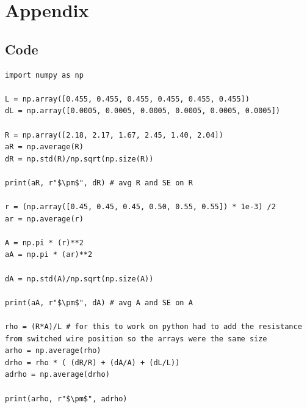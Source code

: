 \documentclass[12pt]{article}
\begin{document}
\newpage



 \label{sec:ref}

\vspace{1.5cm}

\listoffigures

\listoftables

\section*{Appendix} \label{sec:A}

\subsection*{Code}

%

\begin{minipage}{\linewidth}
\captionsetup{hypcap=false}

\begin{mintedbox}
\begin{verbatim}
import numpy as np

L = np.array([0.455, 0.455, 0.455, 0.455, 0.455, 0.455])
dL = np.array([0.0005, 0.0005, 0.0005, 0.0005, 0.0005, 0.0005])

R = np.array([2.18, 2.17, 1.67, 2.45, 1.40, 2.04])
aR = np.average(R)
dR = np.std(R)/np.sqrt(np.size(R))

print(aR, r"$\pm$", dR) # avg R and SE on R

r = (np.array([0.45, 0.45, 0.45, 0.50, 0.55, 0.55]) * 1e-3) /2
ar = np.average(r)

A = np.pi * (r)**2
aA = np.pi * (ar)**2

dA = np.std(A)/np.sqrt(np.size(A))

print(aA, r"$\pm$", dA) # avg A and SE on A

rho = (R*A)/L # for this to work on python had to add the resistance from switched wire position so the arrays were the same size
arho = np.average(rho)
drho = rho * ( (dR/R) + (dA/A) + (dL/L))
adrho = np.average(drho)

print(arho, r"$\pm$", adrho)

\end{verbatim}
\end{mintedbox}

\end{minipage}
\end{document}
